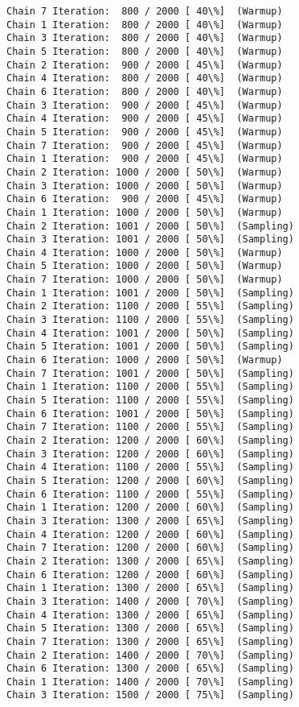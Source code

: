 \documentclass[11pt]{article}
\begin{document}
\begin{Verbatim}[commandchars=\\\{\}]
Chain 7 Iteration:  800 / 2000 [ 40\%]  (Warmup)
Chain 1 Iteration:  800 / 2000 [ 40\%]  (Warmup)
Chain 3 Iteration:  800 / 2000 [ 40\%]  (Warmup)
Chain 5 Iteration:  800 / 2000 [ 40\%]  (Warmup)
Chain 2 Iteration:  900 / 2000 [ 45\%]  (Warmup)
Chain 4 Iteration:  800 / 2000 [ 40\%]  (Warmup)
Chain 6 Iteration:  800 / 2000 [ 40\%]  (Warmup)
Chain 3 Iteration:  900 / 2000 [ 45\%]  (Warmup)
Chain 4 Iteration:  900 / 2000 [ 45\%]  (Warmup)
Chain 5 Iteration:  900 / 2000 [ 45\%]  (Warmup)
Chain 7 Iteration:  900 / 2000 [ 45\%]  (Warmup)
Chain 1 Iteration:  900 / 2000 [ 45\%]  (Warmup)
Chain 2 Iteration: 1000 / 2000 [ 50\%]  (Warmup)
Chain 3 Iteration: 1000 / 2000 [ 50\%]  (Warmup)
Chain 6 Iteration:  900 / 2000 [ 45\%]  (Warmup)
Chain 1 Iteration: 1000 / 2000 [ 50\%]  (Warmup)
Chain 2 Iteration: 1001 / 2000 [ 50\%]  (Sampling)
Chain 3 Iteration: 1001 / 2000 [ 50\%]  (Sampling)
Chain 4 Iteration: 1000 / 2000 [ 50\%]  (Warmup)
Chain 5 Iteration: 1000 / 2000 [ 50\%]  (Warmup)
Chain 7 Iteration: 1000 / 2000 [ 50\%]  (Warmup)
Chain 1 Iteration: 1001 / 2000 [ 50\%]  (Sampling)
Chain 2 Iteration: 1100 / 2000 [ 55\%]  (Sampling)
Chain 3 Iteration: 1100 / 2000 [ 55\%]  (Sampling)
Chain 4 Iteration: 1001 / 2000 [ 50\%]  (Sampling)
Chain 5 Iteration: 1001 / 2000 [ 50\%]  (Sampling)
Chain 6 Iteration: 1000 / 2000 [ 50\%]  (Warmup)
Chain 7 Iteration: 1001 / 2000 [ 50\%]  (Sampling)
Chain 1 Iteration: 1100 / 2000 [ 55\%]  (Sampling)
Chain 5 Iteration: 1100 / 2000 [ 55\%]  (Sampling)
Chain 6 Iteration: 1001 / 2000 [ 50\%]  (Sampling)
Chain 7 Iteration: 1100 / 2000 [ 55\%]  (Sampling)
Chain 2 Iteration: 1200 / 2000 [ 60\%]  (Sampling)
Chain 3 Iteration: 1200 / 2000 [ 60\%]  (Sampling)
Chain 4 Iteration: 1100 / 2000 [ 55\%]  (Sampling)
Chain 5 Iteration: 1200 / 2000 [ 60\%]  (Sampling)
Chain 6 Iteration: 1100 / 2000 [ 55\%]  (Sampling)
Chain 1 Iteration: 1200 / 2000 [ 60\%]  (Sampling)
Chain 3 Iteration: 1300 / 2000 [ 65\%]  (Sampling)
Chain 4 Iteration: 1200 / 2000 [ 60\%]  (Sampling)
Chain 7 Iteration: 1200 / 2000 [ 60\%]  (Sampling)
Chain 2 Iteration: 1300 / 2000 [ 65\%]  (Sampling)
Chain 6 Iteration: 1200 / 2000 [ 60\%]  (Sampling)
Chain 1 Iteration: 1300 / 2000 [ 65\%]  (Sampling)
Chain 3 Iteration: 1400 / 2000 [ 70\%]  (Sampling)
Chain 4 Iteration: 1300 / 2000 [ 65\%]  (Sampling)
Chain 5 Iteration: 1300 / 2000 [ 65\%]  (Sampling)
Chain 7 Iteration: 1300 / 2000 [ 65\%]  (Sampling)
Chain 2 Iteration: 1400 / 2000 [ 70\%]  (Sampling)
Chain 6 Iteration: 1300 / 2000 [ 65\%]  (Sampling)
Chain 1 Iteration: 1400 / 2000 [ 70\%]  (Sampling)
Chain 3 Iteration: 1500 / 2000 [ 75\%]  (Sampling)

\end{Verbatim}
\end{document}
